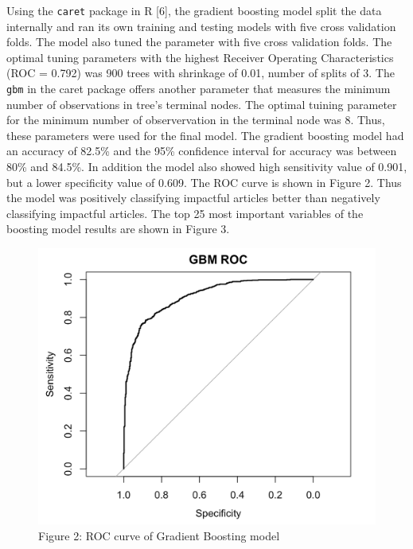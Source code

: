 \documentclass[10pt,letterpaper]{article}
\begin{document}
Using the \texttt{caret} package in R {[}6{]}, the gradient boosting
model split the data internally and ran its own training and testing
models with five cross validation folds. The model also tuned the
parameter with five cross validation folds. The optimal tuning
parameters with the highest Receiver Operating Characteristics (ROC =
0.792) was 900 trees with shrinkage of 0.01, number of splits of 3. The
\texttt{gbm} in the caret package offers another parameter that measures
the minimum number of observations in tree's terminal nodes. The optimal
tuining parameter for the minimum number of observervation in the
terminal node was 8. Thus, these parameters were used for the final
model. The gradient boosting model had an accuracy of 82.5\% and the
95\% confidence interval for accuracy was between 80\% and 84.5\%. In
addition the model also showed high sensitivity value of 0.901, but a
lower specificity value of 0.609. The ROC curve is shown in Figure 2.
Thus the model was positively classifying impactful articles better than
negatively classifying impactful articles. The top 25 most important
variables of the boosting model results are shown in Figure 3.

\begin{figure}
\centering
\includegraphics{roc_gbm.png}
\caption{Figure 2: ROC curve of Gradient Boosting model}
\end{figure}
\end{document}
